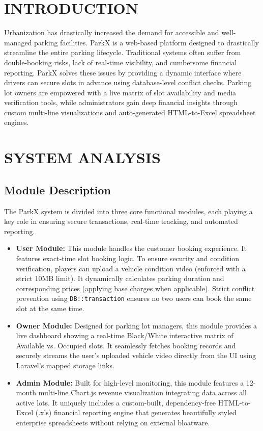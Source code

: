 \documentclass[12pt,a4paper]{report}
\begin{document}
\chapter{INTRODUCTION}
Urbanization has drastically increased the demand for accessible and well-managed parking facilities. ParkX is a web-based platform designed to drastically streamline the entire parking lifecycle. Traditional systems often suffer from double-booking risks, lack of real-time visibility, and cumbersome financial reporting. ParkX solves these issues by providing a dynamic interface where drivers can secure slots in advance using database-level conflict checks. Parking lot owners are empowered with a live matrix of slot availability and media verification tools, while administrators gain deep financial insights through custom multi-line visualizations and auto-generated HTML-to-Excel spreadsheet engines.

\chapter{SYSTEM ANALYSIS}

\section{Module Description}
The ParkX system is divided into three core functional modules, each playing a key role in ensuring secure transactions, real-time tracking, and automated reporting.
\begin{itemize}
    \item \textbf{User Module:} This module handles the customer booking experience. It features exact-time slot booking logic. To ensure security and condition verification, players can upload a vehicle condition video (enforced with a strict 10MB limit). It dynamically calculates parking duration and corresponding prices (applying base charges when applicable). Strict conflict prevention using \texttt{DB::transaction} ensures no two users can book the same slot at the same time.
    \item \textbf{Owner Module:} Designed for parking lot managers, this module provides a live dashboard showing a real-time Black/White interactive matrix of Available vs. Occupied slots. It seamlessly fetches booking records and securely streams the user's uploaded vehicle video directly from the UI using Laravel's mapped storage links.
    \item \textbf{Admin Module:} Built for high-level monitoring, this module features a 12-month multi-line Chart.js revenue visualization integrating data across all active lots. It uniquely includes a custom-built, dependency-free HTML-to-Excel (.xls) financial reporting engine that generates beautifully styled enterprise spreadsheets without relying on external bloatware.
\end{itemize}
\end{document}
